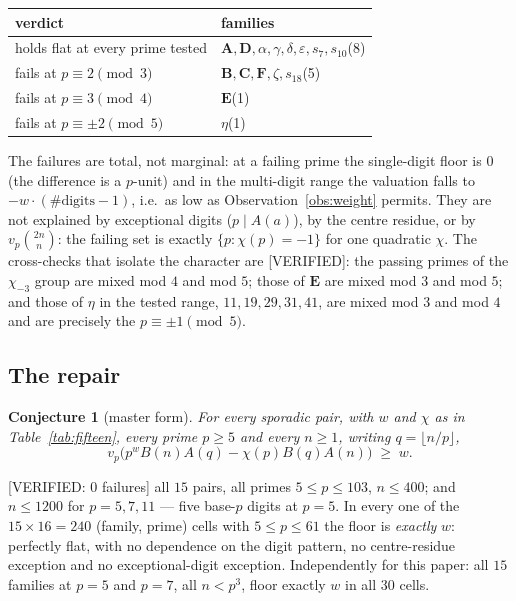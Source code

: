 \documentclass[11pt,reqno]{amsart}
\theoremstyle{plain}
\newtheorem{conjecture}[theorem]{Conjecture}
\theoremstyle{definition}
\theoremstyle{remark}
\newcommand{\vp}{v_p}
\newcommand{\bin}[2]{\binom{#1}{#2}}
\newcommand{\Verified}{\textup{\textsf{[VERIFIED]}}}
\newcommand{\VerifiedR}[1]{\textup{\textsf{[VERIFIED: #1]}}}
\numberwithin{equation}{section}
\begin{document}
\begin{center}\small
\begin{tabular}{@{}ll@{}}
\toprule
verdict & families\\
\midrule
holds flat at every prime tested &
  $\mathbf A,\mathbf D,\alpha,\gamma,\delta,\varepsilon,s_7,s_{10}$\quad(8)\\
fails at $p\equiv2\pmod 3$ & $\mathbf B,\mathbf C,\mathbf F,\zeta,s_{18}$\quad(5)\\
fails at $p\equiv3\pmod 4$ & $\mathbf E$\quad(1)\\
fails at $p\equiv\pm2\pmod 5$ & $\eta$\quad(1)\\
\bottomrule
\end{tabular}
\end{center}

The failures are total, not marginal: at a failing prime the single-digit floor is $0$ (the
difference is a $p$-unit) and in the multi-digit range the valuation falls to
$-w\cdot(\#\text{digits}-1)$, i.e.\ as low as Observation~\ref{obs:weight} permits. They
are not explained by exceptional digits ($p\mid A(a)$), by the centre residue, or by
$\vp\bin{2n}n$: the failing set is exactly $\{p:\chi(p)=-1\}$ for one quadratic $\chi$. The
cross-checks that isolate the character are \Verified: the passing primes of the
$\chi_{-3}$ group are mixed mod $4$ and mod $5$; those of $\mathbf E$ are mixed mod $3$ and
mod $5$; and those of $\eta$ in the tested range, $11,19,29,31,41$, are mixed mod $3$ and
mod $4$ and are precisely the $p\equiv\pm1\pmod5$.

\subsection{The repair}
\begin{conjecture}[master form]\label{conj:master}
For every sporadic pair, with $w$ and $\chi$ as in Table~\ref{tab:fifteen}, every prime
$p\ge5$ and every $n\ge1$, writing $q=\lfloor n/p\rfloor$,
\[
  \vp\bigl(p^{w}B(n)A(q)-\chi(p)B(q)A(n)\bigr)\;\ge\;w .
\]
\end{conjecture}

\VerifiedR{$0$ failures} all $15$ pairs, all primes $5\le p\le103$, $n\le400$; and
$n\le1200$ for $p=5,7,11$ --- five base-$p$ digits at $p=5$. In every one of the
$15\times16=240$ (family, prime) cells with $5\le p\le61$ the floor is \emph{exactly} $w$:
perfectly flat, with no dependence on the digit pattern, no centre-residue exception and no
exceptional-digit exception. Independently for this paper: all $15$ families at $p=5$ and
$p=7$, all $n<p^3$, floor exactly $w$ in all $30$ cells.
\end{document}
